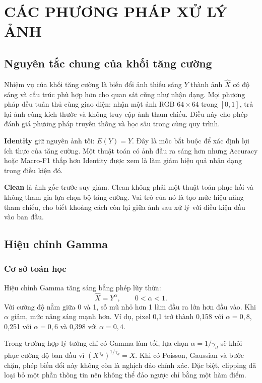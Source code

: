 \section{CÁC PHƯƠNG PHÁP XỬ LÝ ẢNH}
\subsection{Nguyên tắc chung của khối tăng cường}
Nhiệm vụ của khối tăng cường là biến đổi ảnh thiếu sáng $Y$ thành ảnh $\widehat{X}$ có độ sáng và cấu trúc phù hợp hơn cho quan sát cũng như nhận dạng. Mọi phương pháp đều tuân thủ cùng giao diện: nhận một ảnh RGB $64\times64$ trong $[0,1]$, trả lại ảnh cùng kích thước và không truy cập ảnh tham chiếu. Điều này cho phép đánh giá phương pháp truyền thống và học sâu trong cùng quy trình.

\textbf{Identity} giữ nguyên ảnh tối: $E(Y)=Y$. Đây là mốc bắt buộc để xác định lợi ích thực của tăng cường. Một thuật toán có ảnh đầu ra sáng hơn nhưng Accuracy hoặc Macro-F1 thấp hơn Identity được xem là làm giảm hiệu quả nhận dạng trong điều kiện đó.

\textbf{Clean} là ảnh gốc trước suy giảm. Clean không phải một thuật toán phục hồi và không tham gia lựa chọn bộ tăng cường. Vai trò của nó là tạo mức hiệu năng tham chiếu, cho biết khoảng cách còn lại giữa ảnh sau xử lý với điều kiện đầu vào ban đầu.

\subsection{Hiệu chỉnh Gamma}
\subsubsection{Cơ sở toán học}
Hiệu chỉnh Gamma tăng sáng bằng phép lũy thừa:
\begin{equation}
\widehat{X}=Y^{\alpha},\qquad 0<\alpha<1.
\label{eq:gamma}
\end{equation}
Với cường độ nằm giữa 0 và 1, số mũ nhỏ hơn 1 làm đầu ra lớn hơn đầu vào. Khi $\alpha$ giảm, mức nâng sáng mạnh hơn. Ví dụ, pixel 0,1 trở thành 0,158 với $\alpha=0,8$, 0,251 với $\alpha=0,6$ và 0,398 với $\alpha=0,4$.

Trong trường hợp lý tưởng chỉ có Gamma làm tối, lựa chọn $\alpha=1/\gamma_d$ sẽ khôi phục cường độ ban đầu vì $(X^{\gamma_d})^{1/\gamma_d}=X$. Khi có Poisson, Gaussian và bước chặn, phép biến đổi này không còn là nghịch đảo chính xác. Đặc biệt, clipping đã loại bỏ một phần thông tin nên không thể đảo ngược chỉ bằng một hàm điểm.

